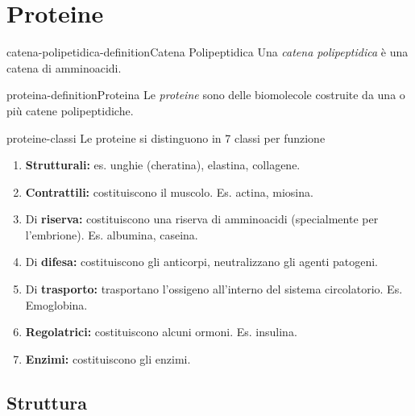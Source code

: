 \documentclass[preview]{standalone}
\begin{document}
\genpage

\section{Proteine}



\begin{snippetdefinition}{catena-polipetidica-definition}{Catena Polipeptidica}
    Una \textit{catena polipeptidica} è una catena di amminoacidi.
\end{snippetdefinition}

\begin{snippetdefinition}{proteina-definition}{Proteina}
    Le \textit{proteine} sono delle biomolecole costruite
    da una o più catene polipeptidiche.
\end{snippetdefinition}

\begin{snippet}{proteine-classi}
    Le proteine si distinguono in 7 classi per funzione
    \begin{enumerate}
        \item \textbf{Strutturali:} es. unghie (cheratina), elastina, collagene.
        \item \textbf{Contrattili:} costituiscono il muscolo. Es. actina, miosina.
        \item Di \textbf{riserva:} costituiscono una riserva di amminoacidi (specialmente per l'embrione).
        Es. albumina, caseina.
        \item Di \textbf{difesa:} costituiscono gli anticorpi, neutralizzano gli agenti patogeni.
        \item Di \textbf{trasporto:} trasportano l'ossigeno all'interno del sistema circolatorio. Es. Emoglobina.
        \item \textbf{Regolatrici:} costituiscono alcuni ormoni. Es. insulina.
        \item \textbf{Enzimi:} costituiscono gli enzimi.
    \end{enumerate}
\end{snippet}

\subsection{Struttura}

\end{document}
